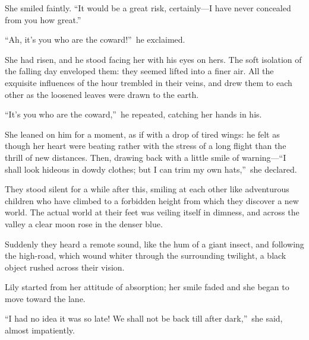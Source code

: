 \documentclass[12pt,a4paper]{book}
\begin{document}
She smiled faintly. ``It would be a great risk, certainly---I have
never concealed from you how great.''





``Ah, it's you who are the coward!''\ he exclaimed.





She had risen, and he stood facing her with his eyes on hers. The
soft isolation of the falling day enveloped them: they seemed
lifted into a finer air. All the exquisite influences of the hour
trembled in their veins, and drew them to each other as the
loosened leaves were drawn to the earth.





``It's you who are the coward,''\ he repeated, catching her hands in
his.





She leaned on him for a moment, as if with a drop of tired wings: 
he felt as though her heart were beating rather with the stress
of a long flight than the thrill of new distances. Then, drawing
back with a little smile of warning---``I shall look hideous in
dowdy clothes; but I can trim my own hats,''\ she declared.





They stood silent for a while after this, smiling at each other
like adventurous children who have climbed to a forbidden height
from which they discover a new world. The actual world at their
feet was veiling itself in dimness, and across the valley a clear
moon rose in the denser blue.





Suddenly they heard a remote sound, like the hum of a giant
insect, and following the high-road, which wound whiter through
the surrounding twilight, a black object rushed across their
vision.





Lily started from her attitude of absorption; her smile faded and
she began to move toward the lane.





``I had no idea it was so late! We shall not be back till after
dark,''\ she said, almost impatiently.
\end{document}

